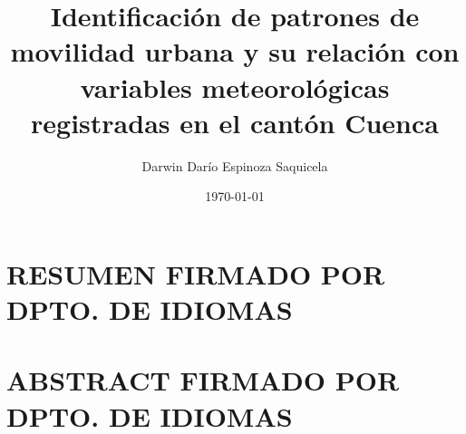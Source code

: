 \documentclass[a4paper]{article}
\title{Identificación de patrones de movilidad urbana y su relación con variables meteorológicas registradas en el cantón Cuenca}
\author{Darwin Darío Espinoza Saquicela}
\date{\today}
\begin{document}
    
    
    \newpage
    
    
    \newpage
    
    
    \newpage
    \renewcommand\contentsname{ÍNDICE}
    \tableofcontents
    
    \newpage
    \renewcommand{\listfigurename}{ÍNDICE DE FIGURAS}
    \listoffigures
    
    \newpage
    \renewcommand{\listtablename}{ÍNDICE DE TABLAS}
    \listoftables
    

    \newpage
    

    
    
    

    \newpage
    \section{RESUMEN FIRMADO POR DPTO. DE IDIOMAS}
    
    \newpage
    \section{ABSTRACT FIRMADO POR DPTO. DE IDIOMAS}
    
    
    
    
\end{document}

